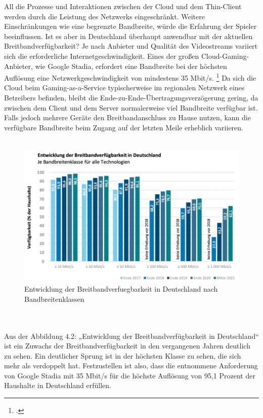 \documentclass[12pt,toc=bib,toc=listof]{scrreprt}
\begin{document}
All die Prozesse und Interaktionen zwischen der Cloud und dem Thin-Client werden durch die Leistung des Netzwerks eingeschränkt. Weitere Einschränkungen wie eine begrenzte Bandbreite, würde die 
Erfahrung der Spieler beeinflussen. Ist es aber in Deutschland überhaupt anwendbar mit der aktuellen Breitbandverfügbarkeit? Je nach Anbieter und Qualität des Videostreams variiert sich die erforderliche 
Internetgeschwindigkeit. Eines der großen Cloud-Gaming-Anbieter, wie Google Stadia, erfordert eine Bandbreite bei der höchsten Auflösung eine Netzwerkgeschwindigkeit von mindestens 35 Mbit/s. \footcite [Vgl.] [] {Stadia.2022}
Da sich die Cloud beim Gaming-as-a-Service typischerweise im regionalen Netzwerk eines Betreibers befinden, bleibt die Ende-zu-Ende-Übertragungsverzögerung gering, da zwischen dem Client und dem Server normalerweise viel Bandbreite verfügbar ist. 
Falls jedoch mehrere Geräte den Breitbandanschluss zu Hause nutzen, kann die verfügbare Bandbreite beim Zugang auf der letzten Meile erheblich variieren.
\\ \\
\begin{figure}[h]
  \centering
  \includegraphics[scale=0.9]{Abbildungen/GaaS_2.png} 
  \caption[atene KOM GmbH (2021)]{Entwicklung der Breitbandverfuegbarkeit in Deutschland nach Bandbreitenklassen}
\end{figure}
\\ \\
Aus der Abbildung 4.2: „Entwicklung der Breitbandverfügbarkeit in Deutschland“ ist ein Zuwachs der Breitbandverfügbarkeit in den vergangenen Jahren deutlich zu sehen. Ein deutlicher Sprung ist in der 
höchsten Klasse zu sehen, die sich mehr als verdoppelt hat. Festzustellen ist also, dass die entnommene Anforderung von Google Stadia mit 35 Mbit/s für die höchste Auflösung 
von 95,1 Prozent der Haushalte in Deutschland erfüllen.
\end{document}
